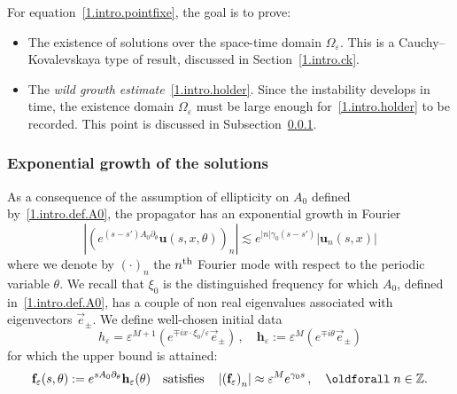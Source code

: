 \documentclass[AHL,Unicode,longabstracts,published]{cedram}
\theoremstyle{plain}
\newcommand*\e{\varepsilon}
\newcommand*\Z{{\mathbb Z}}
\newcommand{\dptl}{\partial}%
\newcommand*\g{\gamma}
\newcommand{\ubf}{{\mathbf u}}
\newcommand*\f{{\mathbf f}}
\newcommand*\h{{\mathbf h}}
\renewcommand*{\forall}{\mathrel{\oldforall}}
\begin{document}
For equation~\eqref{1.intro.pointfixe}, the goal is to prove:
\begin{itemize}
\item The existence of solutions over the space-time domain $\Omega_{\e}$. This is a Cauchy--Kovalevskaya type of result, discussed in Section~\ref{1.intro.ck}.
\item The \emph{wild growth estimate}~\eqref{1.intro.holder}. Since the instability develops in time, the existence domain $\Omega_{\e}$ must be large enough for~\eqref{1.intro.holder} to be recorded. This point is discussed in Subsection~\ref{1.intro.growth.solutions}.
\end{itemize}


\subsubsection{Exponential growth of the solutions}\label{1.intro.growth.solutions}

As a consequence of the assumption of ellipticity on $A_0$ defined by~\eqref{1.intro.def.A0}, the propagator has an exponential growth in Fourier
\begin{equation}
\label{1.intro.growth.fourier}
\left|\left(e^{(s-s')A_0\dptl_{\theta}} \ubf(s,x,\theta)\right)_n\right| \lesssim e^{|n|\g_0(s-s')} | \ubf_n(s,x)|
\end{equation}
where we denote by $(\cdot)_n$ the $n^{\rm th}$ Fourier mode with respect to the periodic variable $\theta$. We recall that $\xi_0$ is the distinguished frequency for which $A_0$, defined in~\eqref{1.intro.def.A0}, has a couple of non real eigenvalues associated with eigenvectors $\vec{e}_{\pm}$. We define well-chosen initial data
\begin{equation}\label{1.intro.initial}
h_{\e} = \e^{M+1} \left(e^{\mp i x\cdot\xi_0/\e} \vec{e}_{\pm} \right)\,, \quad \h_{\e} := \e^{M}\left(e^{ \mp i \theta}\vec{e}_{\pm}\right)
\end{equation}
for which the upper bound is attained:
\begin{equation}\label{1.intro.fepsilon}
\f_{\e}(s,\theta) := e^{sA_0\dptl_{\theta}}\h_{\e}(\theta) \quad \text{satisfies} \quad \left|\left(\f_{\e}\right)_n\right| \approx \e^{M}e^{\g_0s}\,, \quad \forall n\in\Z.
\end{equation}
\end{document}
